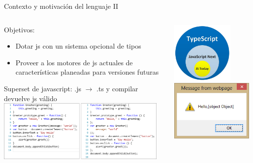 \documentclass{beamer}
\begin{document}
\begin{frame}{Contexto y motivación del lenguaje II}
\begin{columns}[T] %
	\begin{column}[T]{7cm} %
		Objetivos:
		\begin{itemize}
			\item Dotar js con un sistema opcional de tipos
			\item Proveer a los motores de js actuales de características planeadas para versiones futuras
		\end{itemize}
		Superset de javascript: .js $\to$ .ts y compilar devuelve js válido \\
		
		\includegraphics[height=3cm]{imagenes/ts3.png}
	
		
	\end{column}
	\begin{column}[T]{3cm} %
		\includegraphics[height=3cm]{imagenes/ts2.png}
		\includegraphics[height=3cm]{imagenes/ts4.png}
	\end{column}
\end{columns}

\end{frame}
\end{document}

